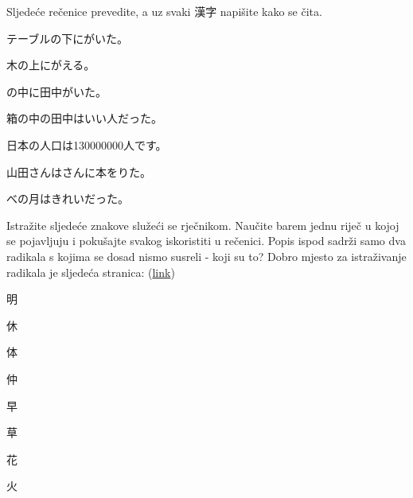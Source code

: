 
\author{Tomislav Mamić}

	
	\begin{mondai}{Sljedeće rečenice prevedite, a uz svaki 漢字 napišite kako se čita.}
		\item テーブルの下にがいた。
		\item 木の上にがえる。
		\item {}の中に田中がいた。
		\item 箱の中の田中はいい人だった。
		\item 日本の人口は130000000人です。
		\item 山田さんはさんに本をりた。
		\item {}べの月はきれいだった。
	\end{mondai}

	\begin{mondai}{Istražite sljedeće znakove služeći se rječnikom. Naučite barem jednu riječ u kojoj se pojavljuju i pokušajte svakog iskoristiti u rečenici. Popis ispod sadrži samo dva radikala s kojima se dosad nismo susreli - koji su to? Dobro mjesto za istraživanje radikala je sljedeća stranica: (\href{https://kanjialive.com/214-traditional-kanji-radicals/}{link})}
		\item 明
		\item 休
		\item 体
		\item 仲
		\item 早
		\item 草
		\item 花
		\item 火
	\end{mondai}

